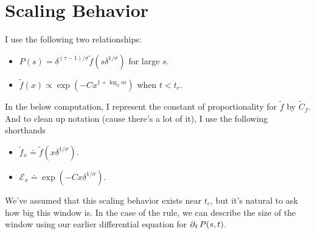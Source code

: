 \documentclass[twoside,10pt]{report}
\begin{document}


\section{Scaling Behavior}

I use the following two relationships:
\begin{itemize}
	\item $P(s) = \delta^{(\tau-1)/\sigma} \tilde{f}(s \delta^{1/\sigma})$ for large $s$.
	\item $\tilde{f}(x) \propto \exp\left( -Cx^{1 + \log_2 m} \right)$ when $t < t_c$.
\end{itemize}
In the below computation, I represent the constant of proportionality for $\tilde{f}$ by $\tilde{C}_{f}$. And to clean up notation (cause there's a lot of it), I use the following shorthands
\begin{itemize}
	\item $\tilde{f}_{x} \doteq \tilde{f}(x \delta^{1/\sigma})$.
	\item $\mathcal{E}_x \doteq \exp\left( -C x \delta^{1/\sigma} \right)$.
\end{itemize}
We've assumed that this scaling behavior exists near $t_{c}$, but it's natural to ask how big this window is. In the case of the \ER rule, we can describe the size of the window using our earlier differential equation for $\operatorname{\partial}_{t}{P}(s, t)$.
\end{document}

